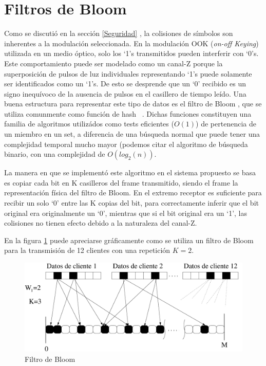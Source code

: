 \section{Filtros de Bloom}
\label{Bloomf}
Como se discutió en la sección \ref{Seguridad} , la colisiones de símbolos son inherentes a la modulación seleccionada.
En la modulación OOK (\textit{on-off Keying}) utilizada en un medio óptico, solo los ‘1’s transmitidos pueden interferir con ‘0’s. Este comportamiento puede ser modelado como un canal-Z porque la superposición de pulsos de luz individuales representando ‘1’s puede solamente ser identificados como un ‘1’s. De esto se desprende que un ‘0’ recibido es un signo inequívoco de la ausencia de pulsos en el casillero de tiempo leído.
Una buena estructura para representar este tipo de datos es el filtro de Bloom \cite{Bloom70space/timetrade-offs}, que se utiliza comunmente como función de hash~ \cite{song2005fast}. Dichas funciones constituyen una familia de algoritmos utilizádos como tests eficientes ($O(1)$) de pertenencia de un miembro en un set, a diferencia de una búsqueda normal que puede tener una complejidad temporal mucho mayor (podemos citar el algoritmo de búsqueda binario, con una complejidad de $O(log_2(n))$.

La manera en que se implementó este algoritmo en el sistema propuesto se basa es copiar cada bit en K casilleros del frame transmitido, siendo el frame la representación física del filtro de Bloom.
En el extremo receptor es suficiente para recibir un solo ‘0’ entre las K copias del bit, para correctamente inferir que el bit original era originalmente un ‘0’, mientras que si el bit original era un ‘1’, las colisiones no tienen efecto debido a la naturaleza del canal-Z.

En la figura \ref{fig:Bloomf} puede apreciarse gráficamente como se utiliza un filtro de Bloom para la transmisión de 12 clientes con una repetición $K=2$. 

\begin{figure}[th]
  \begin{center}
    \includegraphics[scale=0.5]{graphs/frame-sp}
  \end{center}
  \caption{Filtro de Bloom}
  \label{fig:Bloomf}
\end{figure}

